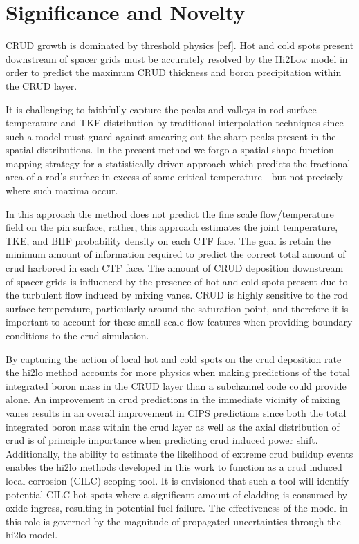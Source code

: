 \section{Significance and Novelty}

CRUD growth is dominated by threshold physics [ref].  Hot and cold spots
present downstream of spacer grids must be accurately resolved by the Hi2Low model
in order to predict the maximum CRUD
thickness and boron precipitation within the CRUD layer.  

It is challenging to faithfully capture the peaks and valleys in
rod surface temperature and TKE distribution by traditional interpolation
techniques since such a model must guard against smearing out the sharp peaks
present in the spatial distributions.  
In the present method we forgo a spatial shape function mapping strategy
for a statistically driven approach which predicts the fractional
area of a rod's surface in excess of some critical temperature - but not
precisely where such maxima occur.

In this approach the method does not predict the fine scale flow/temperature field on the pin surface, rather, this approach estimates the joint temperature, TKE, and BHF probability density on each CTF face.  The goal is retain the minimum amount of information required to predict the correct total amount of crud harbored in each CTF face.  The amount of CRUD deposition downstream of spacer grids is influenced by the presence of hot and cold spots present due to the turbulent flow induced by mixing vanes.  CRUD is highly sensitive to the rod surface temperature, particularly around the saturation point, and therefore it is important to account for these small scale flow features when providing boundary conditions to the crud simulation.

By capturing the action of local hot and cold spots on the crud deposition rate the hi2lo method accounts for more physics when making predictions of the total integrated boron mass in the CRUD layer than a subchannel code could provide alone.  An improvement in crud predictions in the immediate vicinity of mixing vanes results in an overall improvement in CIPS predictions since both the total integrated boron mass within the crud layer as well as the axial distribution of crud is of principle importance when predicting crud induced power shift.  Additionally, the ability to estimate the likelihood of extreme crud buildup events enables the hi2lo methods developed in this work to function as a crud induced local corrosion (CILC) scoping tool.  It is envisioned that such a tool will identify potential CILC hot spots where a significant amount of cladding is consumed by oxide ingress, resulting in potential fuel failure.  The effectiveness of the model in this role is governed by the magnitude of propagated uncertainties through the hi2lo model.

